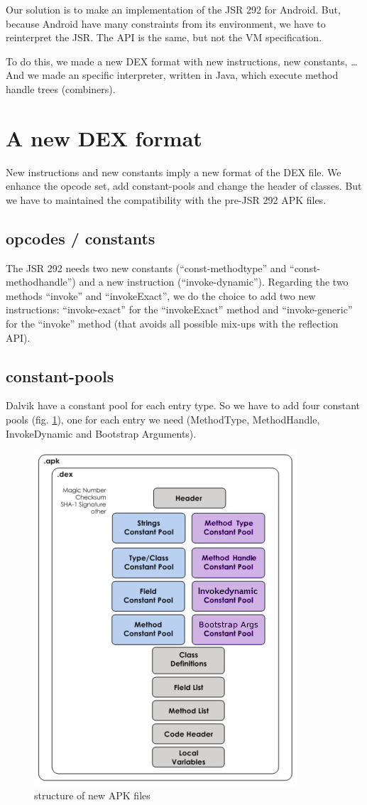 \documentclass{sigplanconf}
\def \Jsr{JSR\xspace}
\def \JSR{\Jsr 292\xspace}
\begin{document}
  Our solution is to make an implementation of the JSR 292 for Android.
  But, because Android have many constraints from its environment,
  we have to reinterpret the JSR.
  The API is the same, but not the VM specification.
    
  To do this, we made a new DEX format with new instructions, new constants, \dots
  And we made an specific interpreter, written in Java, which execute method handle trees (combiners).

\section{A new DEX format}

  New instructions and new constants imply a new format of the DEX file.
  We enhance the opcode set, add constant-pools and change the header of classes.
  But we have to maintained the compatibility with the pre-JSR 292 APK files.

  \subsection{opcodes / constants}
    The \JSR needs two new constants (``const-methodtype'' and ``const-methodhandle'') and a new instruction (``invoke-dynamic'').
    Regarding the two methods ``invoke'' and ``invokeExact'', we do the choice to add two new instructions:
    ``invoke-exact'' for the ``invokeExact'' method and ``invoke-generic'' for the ``invoke'' method (that avoids all possible mix-ups with the reflection API).

  \subsection{constant-pools}

    Dalvik have a constant pool for each entry type.
    So we have to add four constant pools (fig. \ref{SNA}), one for each entry we need
    (MethodType, MethodHandle, InvokeDynamic and Bootstrap Arguments).

    \begin{figure}[!h]
      \centering \includegraphics[width=.5\columnwidth]{structure-apk-292.png}
      \caption{structure of new APK files}
      \label{SNA}
    \end{figure}
\end{document}
